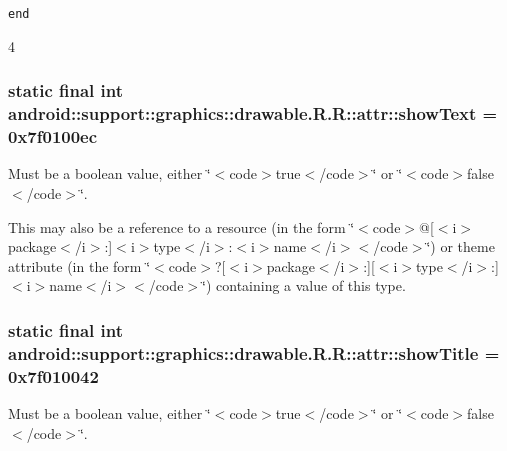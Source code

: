 {\tt end}

4\hypertarget{classandroid_1_1support_1_1graphics_1_1drawable_1_1_r_1_1attr_f00774529f1446f4c95e6a2e354a1176}{
\subsubsection[{showText}]{\setlength{\rightskip}{0pt plus 5cm}static final int android::support::graphics::drawable.R.R::attr::showText = 0x7f0100ec}}
\label{classandroid_1_1support_1_1graphics_1_1drawable_1_1_r_1_1attr_f00774529f1446f4c95e6a2e354a1176}


Must be a boolean value, either \char`\"{}$<$code$>$true$<$/code$>$\char`\"{} or \char`\"{}$<$code$>$false$<$/code$>$\char`\"{}. 

This may also be a reference to a resource (in the form \char`\"{}$<$code$>$@\mbox{[}$<$i$>$package$<$/i$>$:\mbox{]}$<$i$>$type$<$/i$>$:$<$i$>$name$<$/i$>$$<$/code$>$\char`\"{}) or theme attribute (in the form \char`\"{}$<$code$>$?\mbox{[}$<$i$>$package$<$/i$>$:\mbox{]}\mbox{[}$<$i$>$type$<$/i$>$:\mbox{]}$<$i$>$name$<$/i$>$$<$/code$>$\char`\"{}) containing a value of this type. \hypertarget{classandroid_1_1support_1_1graphics_1_1drawable_1_1_r_1_1attr_7c02fb72f0ed75ac455f72b415c65a72}{
\subsubsection[{showTitle}]{\setlength{\rightskip}{0pt plus 5cm}static final int android::support::graphics::drawable.R.R::attr::showTitle = 0x7f010042}}
\label{classandroid_1_1support_1_1graphics_1_1drawable_1_1_r_1_1attr_7c02fb72f0ed75ac455f72b415c65a72}


Must be a boolean value, either \char`\"{}$<$code$>$true$<$/code$>$\char`\"{} or \char`\"{}$<$code$>$false$<$/code$>$\char`\"{}. 

